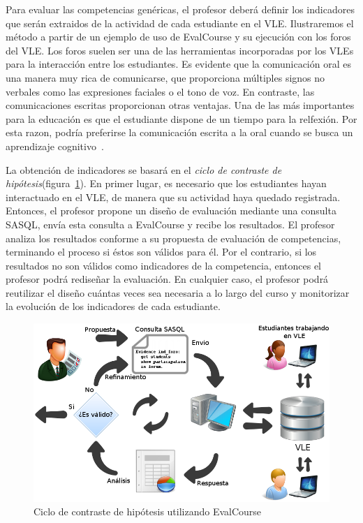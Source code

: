 Para evaluar las competencias genéricas, el profesor deberá definir los indicadores que serán extraidos de la actividad de cada estudiante en el VLE. Ilustraremos el método a partir de un ejemplo de uso de EvalCourse y su ejecución con los foros del VLE. Los foros suelen ser una de las herramientas incorporadas por los VLEs para la interacción entre los estudiantes. Es evidente que la comunicación oral es una manera muy rica de comunicarse, que proporciona múltiples signos no verbales como las expresiones faciales o el tono de voz. En contraste, las comunicaciones escritas proporcionan otras ventajas. Una de las más importantes para la educación es que el estudiante dispone de un tiempo para la relfexión. Por esta razon, podría preferirse la comunicación escrita a la oral cuando se busca un aprendizaje cognitivo~\cite{garrison1999critical}.

La obtención de indicadores se basará en el \emph{ciclo de contraste de hipótesis}(figura~\ref{fig:EVCDiagram}). En primer lugar, es necesario que los estudiantes hayan interactuado en el VLE, de manera que su actividad haya quedado registrada. Entonces, el profesor propone un diseño de evaluación mediante una consulta SASQL, envía esta consulta a EvalCourse y recibe los resultados. El profesor analiza los resultados conforme a su propuesta de evaluación de competencias, terminando el proceso si éstos son válidos para él. Por el contrario, si los resultados no son válidos como indicadores de la competencia, entonces el profesor podrá rediseñar la evaluación. En cualquier caso, el profesor podrá reutilizar el diseño cuántas veces sea necesaria a lo largo del curso y monitorizar la evolución de los indicadores de cada estudiante.

\begin{figure}
  \begin{center}
    \includegraphics[scale=0.45]{EvcDiagram.png}
  \end{center}
  \caption{Ciclo de contraste de hipótesis utilizando EvalCourse}
  \label{fig:EVCDiagram}
\end{figure}

